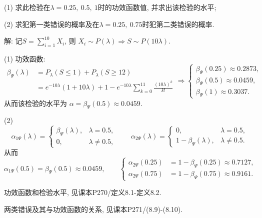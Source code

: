 \documentclass[standard]{ExBook}
\renewenvironment{shaded}{%
  \def\FrameCommand{\fboxsep=\FrameSep \colorbox{shadecolor}}%
  \MakeFramed{\advance\hsize-\width \FrameRestore}%
}{%
  \endMakeFramed
}
\begin{document}
\begin{qitems}
\begin{bbox}
\begin{shaded}
(1) 求此检验在$\lambda=0.25,\ 0.5,\ 1$时的功效函数值, 并求出该检验的水平;

(2) 求犯第一类错误的概率及在$\lambda=0.25,\ 0.75$时犯第二类错误的概率.
    \end{shaded}
    \end{bbox}

\vspace{\dimexpr2.5cm-5em\relax}

解: 记$S=\displaystyle\sum\limits_{i=1}^{10}X_i$, 则
$
X_i\sim P(\lambda)
\Longrightarrow
S\sim P(10\lambda)
$.

(1) 功效函数:
$$
\begin{aligned}
\beta_{\Psi}(\lambda)
&=P_{\lambda}(S\leq1)+P_{\lambda}(S\geq12)\\
&=e^{-10\lambda}(1+10\lambda)
+1-e^{-10\lambda}\sum\limits_{k=0}^{11}\frac{(10\lambda)^k}{k!}
\end{aligned}
\Longrightarrow
\left\{
\begin{array}{l}
\beta_{\Psi}(0.25)\approx0.2873,\\
\beta_{\Psi}(0.5)\approx0.0459,\\
\beta_{\Psi}(1)\approx0.3037.
\end{array}
\right.
$$
从而该检验的水平为
$
\alpha=\beta_{\Psi}(0.5)\approx0.0459
$.

(2)
$$
\alpha_{1\Psi}(\lambda)
=
\left\{
\begin{array}{ll}
\beta_{\Psi}(\lambda), & \lambda=0.5,\\
0, & \lambda\neq0.5,
\end{array}
\right.
\qquad
\alpha_{2\Psi}(\lambda)
=
\left\{
\begin{array}{ll}
0, & \lambda=0.5,\\
1-\beta_{\Psi}(\lambda), & \lambda\neq0.5.
\end{array}
\right.
$$
从而
$$
\alpha_{1\Psi}(0.5)
=\beta_{\Psi}(0.5)
\approx0.0459,
\qquad
\left\{
\begin{aligned}
\alpha_{2\Psi}(0.25)
&=1-\beta_{\Psi}(0.25)
\approx0.7127,\\
\alpha_{2\Psi}(0.75)
&=1-\beta_{\Psi}(0.75)
\approx0.9161.
\end{aligned}
\right.
$$

\textcolor{themeColor}{\selectfont {} 功效函数和检验水平, 见课本P270/定义8.1-定义8.2.}

\textcolor{themeColor}{\selectfont {} 两类错误及其与功效函数的关系, 见课本P271/(8.9)-(8.10).}

\vspace{2.5cm-5em}


\end{qitems}
\end{document}
